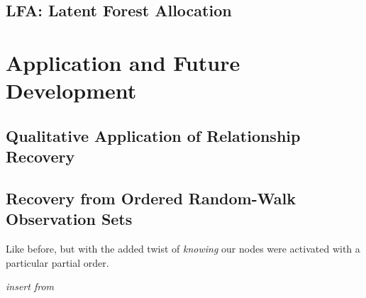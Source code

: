 \documentclass[%
	12pt,
		oneside,
		letterpaper
]{book}
\begin{document}
\chapter{LFA: Latent Forest
Allocation}\label{lfa-latent-forest-allocation}

\part{Application and Future Development}

\chapter{Qualitative Application of Relationship
Recovery}\label{qualitative-application-of-relationship-recovery}

\chapter{Recovery from Ordered Random-Walk Observation
Sets}\label{recovery-from-ordered-random-walk-observation-sets}

Like before, but with the added twist of \emph{knowing} our nodes were
activated with a particular partial order.

\emph{insert from
\autocite{OrganizingTaggedKnowledge_Sexton2020,UsingSemanticFluency_Sexton2019}}


\printbibliography
\end{document}
